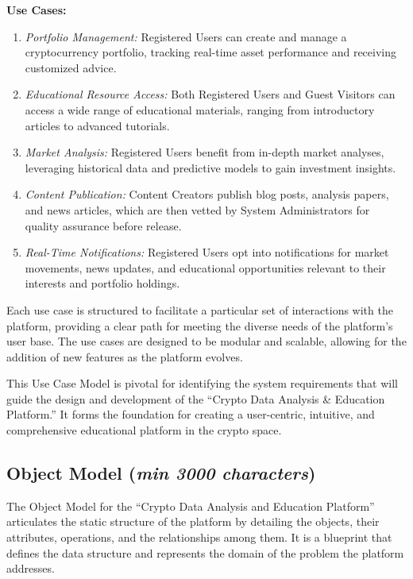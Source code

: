 \documentclass[12pt]{report}
\newcommand{\characters}[1]{(\textit{min #1 characters})}
\begin{document}
\textbf{Use Cases:}
\begin{enumerate}
    \item \textit{Portfolio Management:} Registered Users can create and manage a cryptocurrency portfolio, tracking real-time asset performance and receiving customized advice.
    \item \textit{Educational Resource Access:} Both Registered Users and Guest Visitors can access a wide range of educational materials, ranging from introductory articles to advanced tutorials.
    \item \textit{Market Analysis:} Registered Users benefit from in-depth market analyses, leveraging historical data and predictive models to gain investment insights.
    \item \textit{Content Publication:} Content Creators publish blog posts, analysis papers, and news articles, which are then vetted by System Administrators for quality assurance before release.
    \item \textit{Real-Time Notifications:} Registered Users opt into notifications for market movements, news updates, and educational opportunities relevant to their interests and portfolio holdings.
\end{enumerate}

Each use case is structured to facilitate a particular set of interactions with the platform, providing a clear path for meeting the diverse needs of the platform's user base. The use cases are designed to be modular and scalable, allowing for the addition of new features as the platform evolves.

This Use Case Model is pivotal for identifying the system requirements that will guide the design and development of the ``Crypto Data Analysis \& Education Platform.'' It forms the foundation for creating a user-centric, intuitive, and comprehensive educational platform in the crypto space.


\subsection{Object Model \characters{3000}}
The Object Model for the ``Crypto Data Analysis and Education Platform'' articulates the static structure of the platform by detailing the objects, their attributes, operations, and the relationships among them. It is a blueprint that defines the data structure and represents the domain of the problem the platform addresses.
\end{document}
